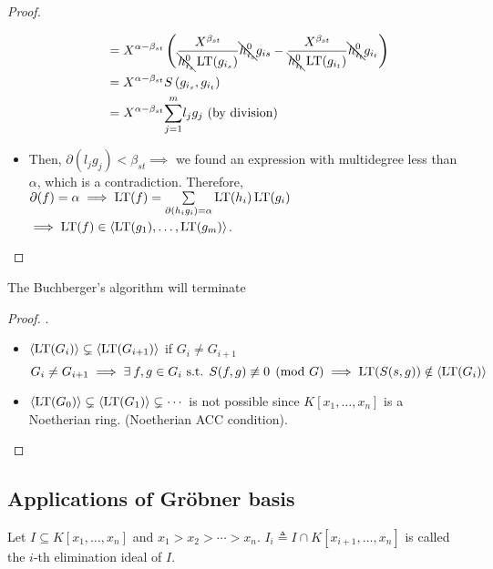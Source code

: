 \begin{theorem}
\begin{proof}
\begin{itemize}
\[\begin{split}
            &= X^{\alpha-\beta_{st}} \left( \frac{X^{\beta_{st}}}{\bcancel{h_{i_s}^0}\operatorname{LT}(g_{i_s})}\bcancel{h_{i_s}^0}g_{is} - \frac{X^{\beta_{st}}}{\bcancel{h_{i_t}^0}\operatorname{LT}(g_{i_t})}\bcancel{h_{i_t}^0}g_{i_t}  \right) \\
            &= X^{\alpha-\beta_{st}} S\left(g_{i_s},g_{i_t}\right) \\
            &= X^{\alpha-\beta_{st}}\overset{m}{\underset{j = 1}{\sum}}{l_jg_j} \text{ (by division)}
          \end{split}
        \]
      \item Then, $\partial(l_jg_j) < \beta_{st} \implies$ we found an expression
        with multidegree less than $\alpha$, which is a contradiction.
        Therefore, $\partial(f) = \alpha \implies \operatorname{LT}(f) =
        \sum\limits_{\partial(h_ig_i) = \alpha} \operatorname{LT}(h_i)\operatorname{LT}(g_i)$
        $\implies \operatorname{LT}(f) \in \langle \operatorname{LT}(g_1),\dots, \operatorname{LT}(g_m) \rangle$.
    \end{itemize}
  \end{proof}
\end{theorem}

\begin{theorem}
  The Buchberger's algorithm will terminate
  \begin{proof}
    $.$
    \begin{itemize}
      \item $\langle \operatorname{LT}(G_i) \rangle \subsetneq \langle \operatorname{LT}(G_{i+1}) \rangle$ if $G_i \neq G_{i+1}$
        \[
          G_i \neq G_{i+1} \implies \exists f, g \in G_i \text{ s.t. } S(f,g)
          \not\equiv 0 \pmod G \implies \LT(S(s,g)) \notin \gen{\LT(G_i)}
        \]
      \item $\langle \operatorname{LT}(G_0) \rangle \subsetneq \langle \operatorname{LT}(G_1) \rangle \subsetneq \dotsm$
        is not possible since $K[x_1, \dots, x_n]$ is a Noetherian ring.
        (Noetherian ACC condition).
    \end{itemize}
  \end{proof}
\end{theorem}

\subsection{Applications of Gr\"{o}bner basis}
\begin{definition}
  Let $I \subseteq K[x_1, \dots, x_n]$ and $x_1 > x_2 > \dotsm > x_n$.
  $I_i \triangleq I \cap K[x_{i+1}, \dots, x_n]$ is called the $i$-th elimination
  ideal of $I$.
\end{definition}

